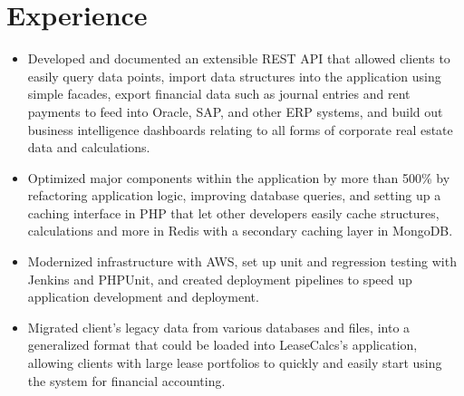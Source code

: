 \documentclass[letterpaper]{deedy-resume} %
\begin{document}
%
%
\begin{minipage}[t]{0.65\textwidth} %

\vspace{-10mm}


\section{Experience}


\begin{itemize}[leftmargin=.5cm]
\item Developed and documented an extensible REST API that allowed clients to easily query data points, import data structures into the application using simple facades, export financial data such as journal entries and rent payments to feed into Oracle, SAP, and other ERP systems, and build out business intelligence dashboards relating to all forms of corporate real estate data and calculations.
\item Optimized major components within the application by more than 500\% by refactoring application logic, improving database queries, and setting up a caching interface in PHP that let other developers easily cache structures, calculations and more in Redis with a secondary caching layer in MongoDB.
\item Modernized infrastructure with AWS, set up unit and regression testing with Jenkins and PHPUnit, and created deployment pipelines to speed up application development and deployment.
\item Migrated client's legacy data from various databases and files, into a generalized format that could be loaded into LeaseCalcs's application, allowing clients with large lease portfolios to quickly and easily start using the system for financial accounting.
\end{itemize}



\end{minipage}
\end{document}
